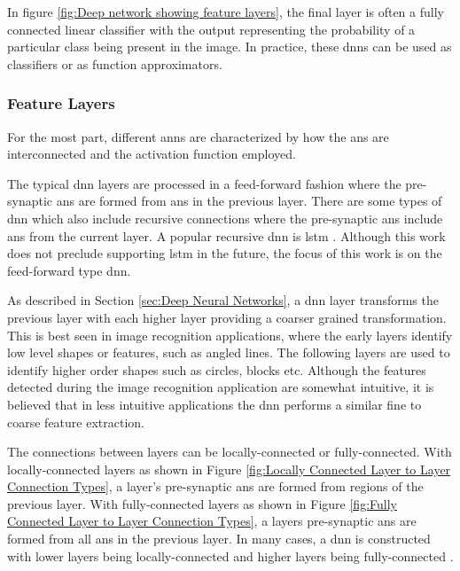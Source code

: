 In figure \ref{fig:Deep network showing feature layers}, the final layer is often a fully connected linear classifier with the output representing the probability of a particular class being present in the image.
In practice, these \acp{dnn} can be used as classifiers or as function approximators.

\iffalse
In practice, useful deep neural networks are very large and often exceed the capacity of single GPUs. Therefore,  there is opportunity for a solution that provides
real-time acceleration and storage of of these systems.
\fi


\subsubsection{Feature Layers}
\label{sec:Feature Layers}

For the most part, different \acp{ann} are characterized by how the \acp{an} are interconnected and the activation function employed.

The typical \ac{dnn} layers are processed in a feed-forward fashion where the pre-synaptic \acp{an} are formed from \acp{an} in the previous layer.
There are some types of \ac{dnn} which also include recursive connections where the pre-synaptic \acp{an} include \acp{an} from the current layer.
A popular recursive \ac{dnn} is \acf{lstm} \cite{hochreiter1997long}. Although this work does not preclude supporting \ac{lstm} in the future, the focus of this work is on the feed-forward type \ac{dnn}.

As described in Section \ref{sec:Deep Neural Networks}, a \ac{dnn} layer transforms the previous layer with each higher layer providing a coarser grained transformation. 
This is best seen in image recognition applications, where the early layers identify low level shapes or features, such as angled lines. 
The following layers are used to identify higher order shapes such as circles, blocks etc. 
Although the features detected during the image recognition application are somewhat intuitive, it is believed that in less intuitive applications the \ac{dnn} performs a similar fine to coarse feature extraction.

The connections between layers can be locally-connected or fully-connected. 
With locally-connected layers as shown in Figure \ref{fig:Locally Connected Layer to Layer Connection Types}, a layer's pre-synaptic \acp{an} are formed from regions of the previous layer.
With fully-connected layers as shown in Figure \ref{fig:Fully Connected Layer to Layer Connection Types}, a layers pre-synaptic \acp{an} are formed from all \acp{an} in the previous layer.
In many cases, a \ac{dnn} is constructed with lower layers being locally-connected and higher layers being fully-connected \cite{krizhevsky2012imagenet}.


